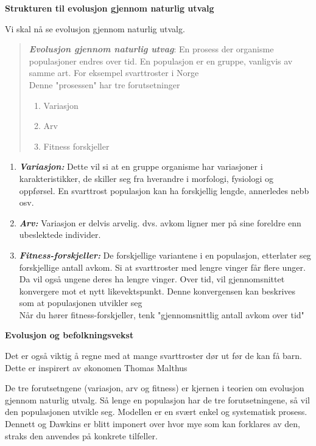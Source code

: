 \documentclass[11pt, a4paper]{article}
\newenvironment{sectionbox}[1][]{%
    \begin{sectionboxinner}
    \textbf{\large #1}
    \vspace{1pt}
    \newline
}{%
    \end{sectionboxinner}
}
\newenvironment{subsectionbox}[1][]{%
    \begin{subsectionboxinner}
    \textbf{#1}
    \vspace{3pt}
    \newline
}{%
    \end{subsectionboxinner}
}
\begin{document}
\begin{sectionbox}[Strukturen til evolusjon gjennom naturlig utvalg]
\begin{flushleft}
    Vi skal nå se evolusjon gjennom naturlig utvalg. 
    \begin{quote}
        \textbf{\textit{Evolusjon gjennom naturlig utvag}}: En prosess der organisme populasjoner endres over tid. En populasjon er en gruppe, vanligvis av samme art. For eksempel svarttroster i Norge\\

        Denne "prosessen" har tre forutsetninger
        \begin{enumerate}
            \item Variasjon
            \item Arv
            \item Fitness forskjeller
        \end{enumerate}
    \end{quote}
\end{flushleft}

\begin{flushleft}
    \begin{enumerate}
        \item \textbf{\textit{Variasjon:}} Dette vil si at en gruppe organisme har variasjoner i karakteristikker, de skiller seg fra hverandre i morfologi, fysiologi og oppførsel. En svarttrost populasjon kan ha forskjellig lengde, annerledes nebb osv.
        \item \textbf{\textit{Arv:}} Variasjon er delvis arvelig. dvs. avkom ligner mer på sine foreldre enn ubeslektede individer. 
        \item \textbf{\textit{Fitness-forskjeller:}} De forskjellige variantene i en populasjon, etterlater seg forskjellige antall avkom. Si at svarttroster med lengre vinger får flere unger. Da vil også ungene deres ha lengre vinger. Over tid, vil gjennomsnittet konvergere mot et nytt likevektspunkt. Denne konvergensen kan beskrives som at populasjonen utvikler seg\\
        

        Når du hører fitness-forskjeller, tenk "gjennomsnittlig antall avkom over tid"
    \end{enumerate}
\end{flushleft}

\begin{subsectionbox}[Evolusjon og befolkningsvekst]
    Det er også viktig å regne med at mange svarttroster dør ut før de kan få barn. Dette er inspirert av økonomen Thomas Malthus
\end{subsectionbox}

De tre forutsetngene (variasjon, arv og fitness) er kjernen i teorien om evolusjon gjennom naturlig utvalg. Så lenge en populasjon har de tre forutsetningene, så vil den populasjonen utvikle seg. Modellen er en svært enkel og systematisk prosess. Dennett og Dawkins er blitt imponert over hvor mye som kan forklares av den, straks den anvendes på konkrete tilfeller.
\end{sectionbox}
\end{document}
